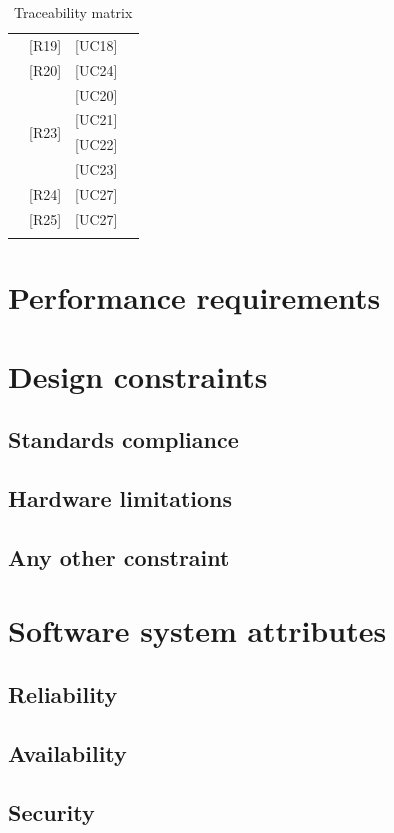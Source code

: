 \documentclass[12pt]{report}
\begin{document}
\begin{longtable}{c | c | c | c}
    				           & [R19] & [UC18] & \\ \cline{2-4}
    				           & [R20] & [UC24] & \\ \cline{2-4}
    				           & \multirow{4}{*}{[R23]} & [UC20] & \\ \cline{3-4}
    				           &                        & [UC21] & \\ \cline{3-4}
    				           &                        & [UC22] & \\ \cline{3-4}
    				           &                        & [UC23] & \\ \cline{2-4}
    				           & [R24] & [UC27] & \\ \cline{2-4}
    				           & [R25] & [UC27] & \\
    \hline
    \caption{Traceability matrix}
	\label{fig:Traceability matrix}
\end{longtable}

\section{Performance requirements}

\section{Design constraints}
\subsection{Standards compliance}
\subsection{Hardware limitations}
\subsection{Any other constraint}

\section{Software system attributes}
\subsection{Reliability}
\subsection{Availability}
\subsection{Security}
\end{document}
